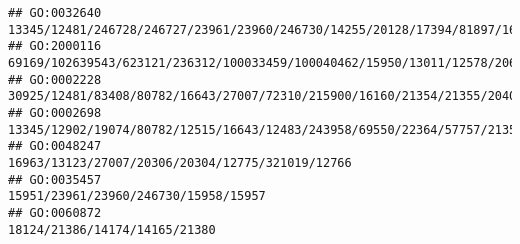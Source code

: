 \documentclass[
]{article}
\begin{document}
\begin{verbatim}
## GO:0032640                                                                                                                                                                                                                                                                                              13345/12481/246728/246727/23961/23960/246730/14255/20128/17394/81897/16160/20303/12775/110168/12475/20371/12229
## GO:2000116                                                                                                                                                                                                                                                                                    69169/102639543/623121/236312/100033459/100040462/15950/13011/12578/20617/12047/76884/18053/18095/54483/19876/16912/15511
## GO:0002228                                                                                                                                                                                                                                                                                                                                     30925/12481/83408/80782/16643/27007/72310/215900/16160/21354/21355/20400
## GO:0002698                                                                                                                                                                                                                                                                                                                   13345/12902/19074/80782/12515/16643/12483/243958/69550/22364/57757/21354/21355/60533/20371
## GO:0048247                                                                                                                                                                                                                                                                                                                                                             16963/13123/27007/20306/20304/12775/321019/12766
## GO:0035457                                                                                                                                                                                                                                                                                                                                                                         15951/23961/23960/246730/15958/15957
## GO:0060872                                                                                                                                                                                                                                                                                                                                                                                18124/21386/14174/14165/21380

\end{verbatim}
\end{document}
